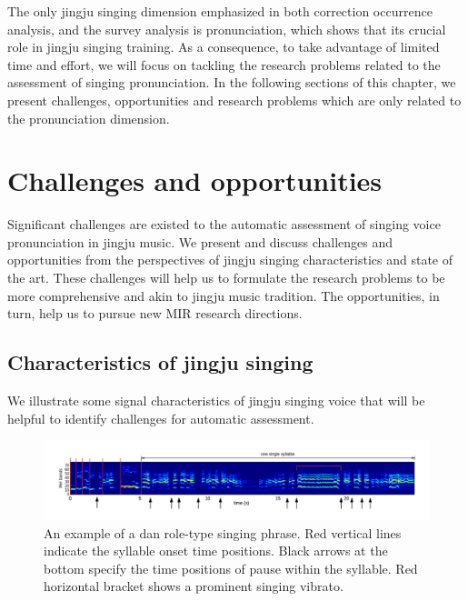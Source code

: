 The only jingju singing dimension emphasized in both correction occurrence analysis, and the survey analysis is pronunciation, which shows that its crucial role in jingju singing training. As a consequence, to take advantage of limited time and effort, we will focus on tackling the research problems related to the assessment of singing pronunciation. In the following sections of this chapter, we present challenges, opportunities and research problems which are only related to the pronunciation dimension.

\section{Challenges and opportunities}

Significant challenges are existed to the automatic assessment of singing voice pronunciation in jingju music. We present and discuss challenges and opportunities from the perspectives of jingju singing characteristics and state of the art. These challenges will help us to formulate the research problems to be more comprehensive and akin to jingju music tradition. The opportunities, in turn, help us to pursue new MIR research directions. 

\subsection{Characteristics of jingju singing}\label{sec:ch3:char_singing}

We illustrate some signal characteristics of jingju singing voice that will be helpful to identify challenges for automatic assessment. 

\begin{landscape}
\mbox{}\vfill
\begin{figure}[ht!]
\includegraphics[width=1.8\textwidth]{figs/spectro_vis/ch3_jingju_char.png}
\caption{An example of a dan role-type singing phrase. Red vertical lines indicate the syllable onset time positions. Black arrows at the bottom specify the time positions of pause within the syllable. Red horizontal bracket shows a prominent singing vibrato.}
\label{fig:jingju_char}
\end{figure}
\vfill
\end{landscape}

